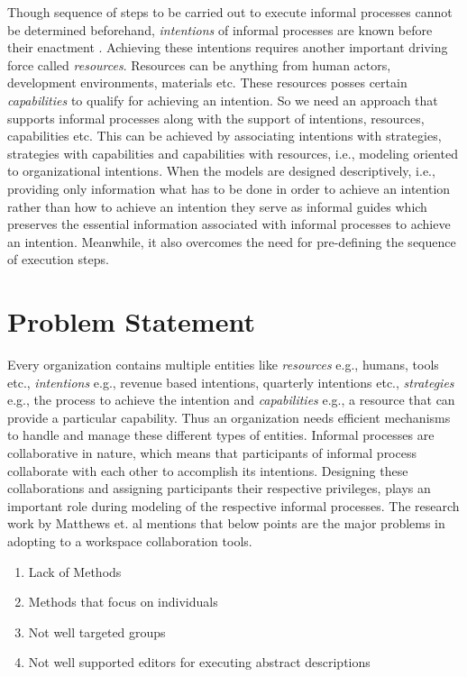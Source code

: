 Though sequence of steps to be carried out to execute informal processes cannot be determined beforehand, \textit{intentions} of informal processes are known before their enactment \cite{Sungur2015}. Achieving these intentions requires another important driving force called \textit{resources}. Resources can be anything from human actors, development environments, materials etc. These resources posses certain \textit{capabilities} to qualify for achieving an intention. So we need an approach that supports informal processes along with the support of intentions, resources, capabilities etc. This can be achieved by associating intentions with strategies, strategies with capabilities and capabilities with resources, i.e., modeling oriented to organizational intentions. When the models are designed descriptively, i.e., providing only information what has to be done in order to achieve an intention rather than how to achieve an intention they serve as informal guides which preserves the essential information associated with informal processes to achieve an intention. Meanwhile, it also overcomes the need for pre-defining the sequence of execution steps.

\section{Problem Statement}
\label{sec:problemstatement}
 Every organization contains multiple entities like \textit{resources} e.g., humans, tools etc., \textit{intentions} e.g., revenue based intentions, quarterly intentions etc., \textit{strategies} e.g., the process to achieve the intention and \textit{capabilities} e.g., a resource that can provide a particular capability. Thus an organization needs efficient mechanisms to handle and manage these different types of entities. Informal processes are collaborative in nature, which means that participants of informal process collaborate with each other to accomplish its intentions\cite{Sungur2015}. Designing these collaborations and assigning participants their respective privileges, plays an important role during modeling of the respective informal processes. The research work by Matthews et. al \cite{Matthews2011} mentions that below points are the major problems in adopting to a workspace collaboration tools.

\begin{enumerate}
	\item Lack of Methods
	\item Methods that focus on individuals
	\item Not well targeted groups
	\item Not well supported editors for executing abstract descriptions
\end{enumerate}

